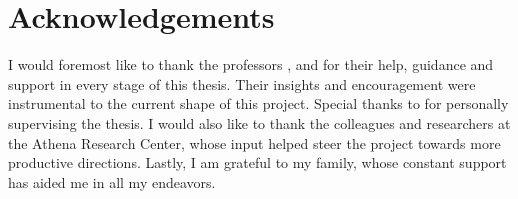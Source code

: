 %
\chapter*{Acknowledgements}
\label{sec:acknowledgements}
\vspace*{-10mm}

I would foremost like to thank the professors \thesisSupervisor, \thesisReviewerOne and \thesisReviewerTwo for their help, guidance and support in every stage of this thesis. Their insights and encouragement were instrumental to the current shape of this project. Special thanks to \thesisSupervisorTitle \thesisSupervisor for personally supervising the thesis. I would also like to thank the colleagues and researchers at the Athena Research Center, whose input helped steer the project towards more productive directions. Lastly, I am grateful to my family, whose constant support has aided me in all my endeavors. 